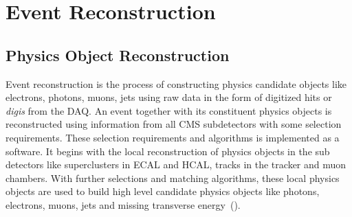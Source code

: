 \chapter{Event Reconstruction}
\label{Reconstruction_and Particle_ID_chapter}
\section{Physics Object Reconstruction}
Event reconstruction is the process of constructing physics candidate objects like electrons, photons, muons, jets using raw data in the form of digitized hits or \textit{digis} from the DAQ. An event together with its constituent physics objects is reconstructed using information from all CMS subdetectors with some selection requirements. These selection requirements and algorithms is implemented as a software. It begins with the local reconstruction of physics objects in the sub detectors like superclusters in ECAL and HCAL, tracks in the tracker and muon chambers. With further selections and matching algorithms, these local physics objects are used to 
build high level candidate physics objects like photons, electrons, muons, jets and missing transverse energy~(\MET).

